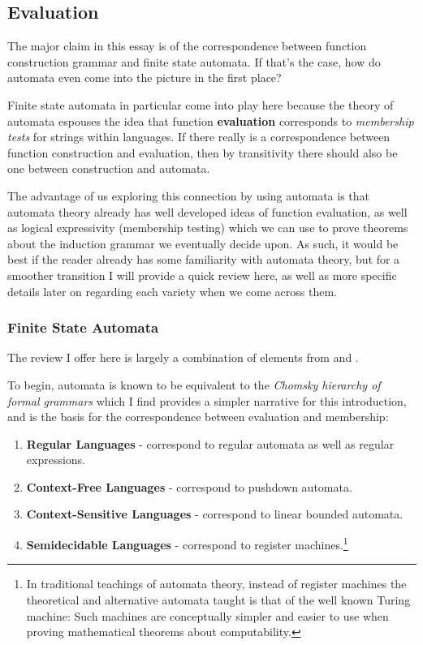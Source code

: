 \documentclass[twoside]{article}
\newcommand{\strong}[1]{{\bfseries #1}}
\begin{document}
\subsection*{Evaluation}

The major claim in this essay is of the correspondence between function construction grammar and finite state automata.
If that's the case, how do automata even come into the picture in the first place?

Finite state automata in particular come into play here because the theory of automata espouses the idea that
function \strong{evaluation} corresponds to \emph{membership tests} for strings within languages. If there really
is a correspondence between function construction and evaluation, then by transitivity there should also be one
between construction and automata.

The advantage of us exploring this connection by using automata is that automata theory already has well developed ideas
of function evaluation, as well as logical expressivity (membership testing) which we can use to prove theorems about the
induction grammar we eventually decide upon. As such, it would be best if the reader already has some familiarity with
automata theory, but for a smoother transition I will provide a quick review here, as well as more specific details
later on regarding each variety when we come across them.

\subsubsection*{Finite State Automata}

The review I offer here is largely a combination of elements from \cite{iatlc} and \cite{sicp}.

To begin, automata is known to be equivalent to the \emph{Chomsky hierarchy of formal grammars} which I find provides
a simpler narrative for this introduction, and is the basis for the correspondence between evaluation and membership:

\begin{enumerate}
\item \strong{Regular Languages} - correspond to regular automata as well as regular expressions.
\item \strong{Context-Free Languages} - correspond to pushdown automata.
\item \strong{Context-Sensitive Languages} - correspond to linear bounded automata.
\item \strong{Semidecidable Languages} - correspond to register machines.\footnote{In traditional teachings of automata
      theory, instead of register machines the theoretical and alternative automata taught is that of the well known Turing
      machine: Such machines are conceptually simpler and easier to use when proving mathematical theorems about computability.}
\end{enumerate}
\end{document}
